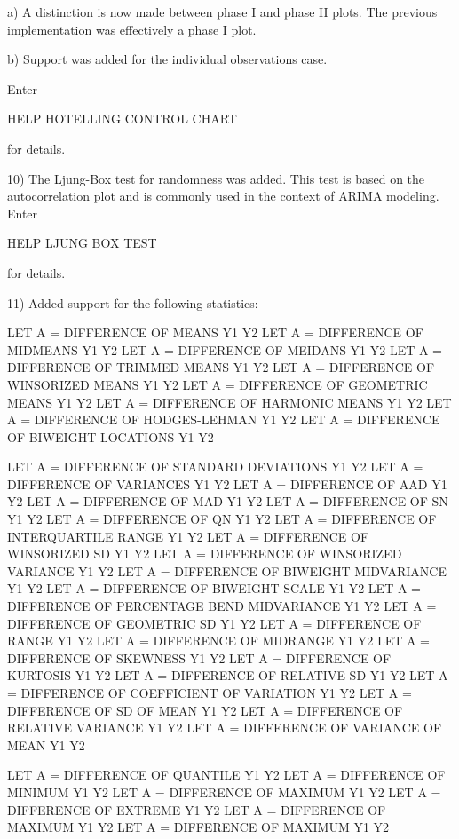 {    a) A distinction is now made between phase I and phase II plots.
       The previous implementation was effectively a phase I plot.

    b) Support was added for the individual observations case.

    Enter

        HELP HOTELLING CONTROL CHART

    for details.

10) The Ljung-Box test for randomness was added.  This test is based
    on the autocorrelation plot and is commonly used in the context
    of ARIMA modeling.  Enter

         HELP LJUNG BOX TEST

    for details.

11) Added support for the following statistics:

        LET A = DIFFERENCE OF MEANS Y1 Y2
        LET A = DIFFERENCE OF MIDMEANS Y1 Y2
        LET A = DIFFERENCE OF MEIDANS Y1 Y2
        LET A = DIFFERENCE OF TRIMMED MEANS Y1 Y2
        LET A = DIFFERENCE OF WINSORIZED MEANS Y1 Y2
        LET A = DIFFERENCE OF GEOMETRIC MEANS Y1 Y2
        LET A = DIFFERENCE OF HARMONIC MEANS Y1 Y2
        LET A = DIFFERENCE OF HODGES-LEHMAN Y1 Y2
        LET A = DIFFERENCE OF BIWEIGHT LOCATIONS Y1 Y2

        LET A = DIFFERENCE OF STANDARD DEVIATIONS Y1 Y2
        LET A = DIFFERENCE OF VARIANCES Y1 Y2
        LET A = DIFFERENCE OF AAD Y1 Y2
        LET A = DIFFERENCE OF MAD Y1 Y2
        LET A = DIFFERENCE OF SN Y1 Y2
        LET A = DIFFERENCE OF QN Y1 Y2
        LET A = DIFFERENCE OF INTERQUARTILE RANGE Y1 Y2
        LET A = DIFFERENCE OF WINSORIZED SD Y1 Y2
        LET A = DIFFERENCE OF WINSORIZED VARIANCE Y1 Y2
        LET A = DIFFERENCE OF BIWEIGHT MIDVARIANCE Y1 Y2
        LET A = DIFFERENCE OF BIWEIGHT SCALE Y1 Y2
        LET A = DIFFERENCE OF PERCENTAGE BEND MIDVARIANCE Y1 Y2
        LET A = DIFFERENCE OF GEOMETRIC SD Y1 Y2
        LET A = DIFFERENCE OF RANGE Y1 Y2
        LET A = DIFFERENCE OF MIDRANGE Y1 Y2
        LET A = DIFFERENCE OF SKEWNESS Y1 Y2
        LET A = DIFFERENCE OF KURTOSIS Y1 Y2
        LET A = DIFFERENCE OF RELATIVE SD Y1 Y2
        LET A = DIFFERENCE OF COEFFICIENT OF VARIATION Y1 Y2
        LET A = DIFFERENCE OF SD OF MEAN Y1 Y2
        LET A = DIFFERENCE OF RELATIVE VARIANCE Y1 Y2
        LET A = DIFFERENCE OF VARIANCE OF MEAN Y1 Y2

        LET A = DIFFERENCE OF QUANTILE Y1 Y2
        LET A = DIFFERENCE OF MINIMUM Y1 Y2
        LET A = DIFFERENCE OF MAXIMUM Y1 Y2
        LET A = DIFFERENCE OF EXTREME Y1 Y2
        LET A = DIFFERENCE OF MAXIMUM Y1 Y2
        LET A = DIFFERENCE OF MAXIMUM Y1 Y2

}
